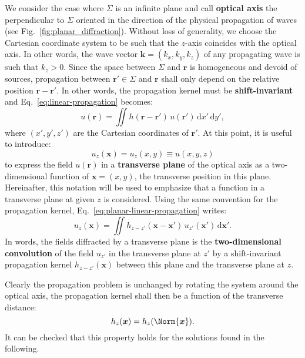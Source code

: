 \documentclass[a4paper]{article}
\newcommand{\V}[1]{\boldsymbol{#1}}
\newcommand*{\mathd}{\mathrm{d}}
\begin{document}
We consider the case where $Σ$ is an infinite plane and call \textbf{optical
  axis} the perpendicular to $Σ$ oriented in the direction of the physical
propagation of waves (see Fig.~\ref{fig:planar_diffraction}). Without loss of
generality, we choose the Cartesian coordinate system to be such that the
$z$-axis coincides with the optical axis. In other words, the wave vector
$\V{k} = (k_{x},k_{y},k_{z})$ of any propagating wave is such that $k_{z} > 0$.
Since the space between $Σ$ and $\V{r}$ is homogeneous and devoid of sources,
propagation between $\V{r}' ∈ Σ$ and $\V{r}$ shall only depend on the relative
position $\V{r} - \V{r}'$. In other words, the propagation kernel must be
\textbf{shift-invariant} and Eq.~\eqref{eq:linear-propagation} becomes:
\begin{equation}
  \label{eq:planar-linear-propagation}
  u(\V{r}) = \iint h(\V{r} - \V{r}')\,u(\V{r}')\,\mathd x'\,\mathd y',
\end{equation}
where $(x',y',z')$ are the Cartesian coordinates of $\V{r}'$. At
this point, it is useful to introduce:
\begin{equation}
  \label{eq:u_z}
  u_{z}(\V{x}) = u_{z}(x,y) ≡ u(x,y,z)
\end{equation}
to express the field $u(\V{r})$ in a \textbf{transverse plane} of the optical
axis as a two-dimensional function of $\V{x} = (x,y)$, the transverse position
in this plane. Hereinafter, this notation will be used to emphasize that a
function in a transverse plane at given $z$ is considered. Using the same
convention for the propagation kernel, Eq.~\eqref{eq:planar-linear-propagation}
writes:
\begin{equation}
  \label{eq:convolutive-propagation}
  u_{z}(\V{x}) =
  \iint h_{z - z'}(\V{x} - \V{x}')\,
  u_{z'}(\V{x}')\,\mathd\V{x}'.
\end{equation}
In words, the fields diffracted by a transverse plane is the
\textbf{two-dimensional convolution} of the field $u_{z'}$ in the transverse
plane at $z'$ by a shift-invariant propagation kernel
$h_{z - z'}(\V{x})$ between this plane and the transverse plane at
$z$.

Clearly the propagation problem is unchanged by rotating the system around the
optical axis, the propagation kernel shall then be a function of the transverse
distance:
\begin{equation}
  \label{eq:invariance_by_rotation}
  h_{z}(\V{x}) = h_{z}(\Norm{\V{x}}).
\end{equation}
It can be checked that this property holds for the solutions found in the
following.
\end{document}
